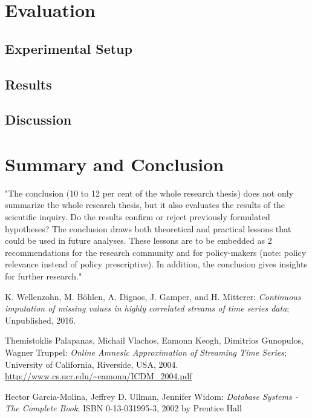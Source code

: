 \documentclass[abstracton,12pt]{scrreprt}
\begin{document}
\chapter{Evaluation}
\label{sec:Experimental}
\section{Experimental Setup}
\section{Results}
\section{Discussion}

\chapter{Summary and Conclusion}
\label{sec:Summary}
"The conclusion (10 to 12 per cent of the whole research thesis) does not only summarize the whole research thesis, but it also evaluates the results of the scientific inquiry. Do the results confirm or reject previously formulated hypotheses? The conclusion draws both theoretical and practical lessons that could be used in future analyses. These lessons are to be embedded as
2
recommendations for the research community and for policy-makers (note: policy relevance instead of policy prescriptive). In addition, the conclusion gives insights for further research."

\begin{thebibliography}{99}
	
	
	 K. Wellenzohn, M. Böhlen, A. Dignos, J. Gamper, and H. Mitterer: \emph{Continuous imputation of missing values in highly correlated streams of time series data}; Unpublished, 2016.
	
	 Themistoklis Palapanas, Michail Vlachos, Eamonn Keogh, Dimitrios Gunopulos, Wagner Truppel: \emph{Online Amnesic Approximation of Streaming Time Series}; University of California, Riverside, USA, 2004. \url{http://www.cs.ucr.edu/~eamonn/ICDM_2004.pdf}

	 Hector Garcia-Molina, Jeffrey D. Ullman, Jennifer Widom: \emph{Database Systems - The Complete Book}; ISBN 0-13-031995-3, 2002 by Prentice Hall
		
	



\end{thebibliography}
\end{document}
